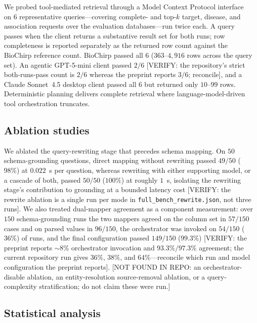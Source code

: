 We probed tool-mediated retrieval through a Model Context Protocol interface on $6$ representative queries---covering complete- and top-$k$ target, disease, and association requests over the evaluation databases---run twice each. A query passes when the client returns a substantive result set for both runs; row completeness is reported separately as the returned row count against the BioChirp reference count. BioChirp passed all $6$ ($363$--$4{,}916$ rows across the query set). An agentic GPT-5-mini client passed $2/6$ [VERIFY: the repository's strict both-runs-pass count is $2/6$ whereas the preprint reports $3/6$; reconcile], and a Claude Sonnet~4.5 desktop client passed all $6$ but returned only $10$--$99$ rows. Deterministic planning delivers complete retrieval where language-model-driven tool orchestration truncates.

\subsection*{Ablation studies}

We ablated the query-rewriting stage that precedes schema mapping. On $50$ schema-grounding questions, direct mapping without rewriting passed $49/50$ ($98\%$) at $0.022$~s per question, whereas rewriting with either supporting model, or a cascade of both, passed $50/50$ ($100\%$) at roughly $1$~s, isolating the rewriting stage's contribution to grounding at a bounded latency cost [VERIFY: the rewrite ablation is a single run per mode in \texttt{full\_bench\_rewrite.json}, not three runs]. We also treated dual-mapper agreement as a component measurement: over $150$ schema-grounding runs the two mappers agreed on the column set in $57/150$ cases and on parsed values in $96/150$, the orchestrator was invoked on $54/150$ ($36\%$) of runs, and the final configuration passed $149/150$ ($99.3\%$) [VERIFY: the preprint reports $\sim\!8\%$ orchestrator invocation and $93.3\%/97.3\%$ agreement; the current repository run gives $36\%$, $38\%$, and $64\%$---reconcile which run and model configuration the preprint reports]. [NOT FOUND IN REPO: an orchestrator-disable ablation, an entity-resolution source-removal ablation, or a query-complexity stratification; do not claim these were run.]

\subsection*{Statistical analysis}

